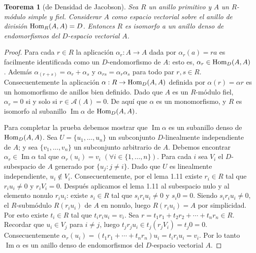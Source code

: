 \documentclass{report}
\newcommand{\Hom}{\textnormal{Hom}}
\DeclareMathOperator{\image}{\text{Im}}
\newtheorem{theorem}{Teorema}
\begin{document}
  \begin{theorem}[de Densidad de Jacobson]
    \label{theorem:jacobsonDensityTheorem}
    Sea \(R\) un anillo primitivo y \(A\) un \(R\)-módulo simple y fiel.
    Considerar \(A\) como espacio vectorial sobre el anillo de división \(\Hom_R(A, A) = D\).
    Entonces \(R\) es isomorfo a un anillo denso de endomorfismos del \(D\)-espacio vectorial \(A\).
  \end{theorem}
  \begin{proof}
    Para cada \(r \in R\) la aplicación \(\alpha_r : A \rightarrow A\) dada por \(\alpha_r(a) = r a\) es facilmente identificada como un \(D\)-endomorfismo de \(A\): esto es, \(\alpha_r \in \Hom_D(A, A)\).
    Además \(\alpha_{(r + s)} = \alpha_r + \alpha_s\) y \(\alpha_{r s} = \alpha_r \alpha_s\) para todo par \(r, s \in R\).
    Consecuentemente la aplicación \(\alpha : R \rightarrow \Hom_D(A, A)\) definida por \(\alpha(r) = \alpha r\) es un homomorfismo de anillos bien definido.
    Dado que \(A\) es un \(R\)-módulo fiel, \(\alpha_r = 0\) si y solo si \(r \in \mathcal{A}(A) = 0\).
    De aquí que \(\alpha\) es un monomorfismo, y \(R\) es isomorfo al subanillo \(\image \alpha\) de \(\Hom_D(A, A)\).

    Para completar la prueba debemos mostrar que \(\image \alpha\) es un subanillo denso de \(\Hom_D(A, A)\).
    Sea \(U = \{u_1, \dots, u_n\}\) un subconjunto \(D\)-linealmente independiente de \(A\); y sea \(\{v_1, \dots, v_n\}\) un subconjunto arbitrario de \(A\).
    Debemos encontrar \(\alpha_r \in \image \alpha\) tal que \(\alpha_r(u_i) = v_i\) \((\forall i \in \{1, \dots, n\})\).
    Para cada \(i\) sea \(V_i\) el \(D\)-subespacio de \(A\) generado por \(\{u_j : j \neq i\}\).
    Dado que \(U\) es linealmente independiente, \(u_i \notin V_i\).
    Consecuentemente, por el lema 1.11 existe \(r_i \in R\) tal que \(r_i u_i \neq 0\) y \(r_i V_i = 0\).
    Después aplicamos el lema 1.11 al subespacio nulo y al elemento nonulo \(r_i u_i\):
    existe \(s_i \in R\) tal que \(s_i r_i u_i \neq 0\) y \(s_i 0 = 0\).
    Siendo \(s_i r_i u_i \neq 0\), el \(R\)-submódulo \(R (r_i u_i)\) de \(A\) en nonulo, luego \(R (r_i u_i) = A\) por simplicidad.
    Por esto existe \(t_i \in R\) tal que \(t_i r_i u_i = v_i\).
    Sea \(r = t_1 r_1 + t_2 r_2 + \cdots + t_n r_n \in R\).
    Recordar que \(u_i \in V_j\) para \(i \neq j\), luego \(t_j r_j u_i \in t_j (r_j V_i) = t_j 0 = 0\).
    Consecuentemente \(\alpha_r(u_i) = (t_1 r_1 + \cdots + t_n r_n) u_i = t_i r_i u_i = v_i\).
    Por lo tanto \(\image \alpha\) es un anillo denso de endomorfismos del \(D\)-espacio vectorial \(A\).
  \end{proof}
\end{document}
